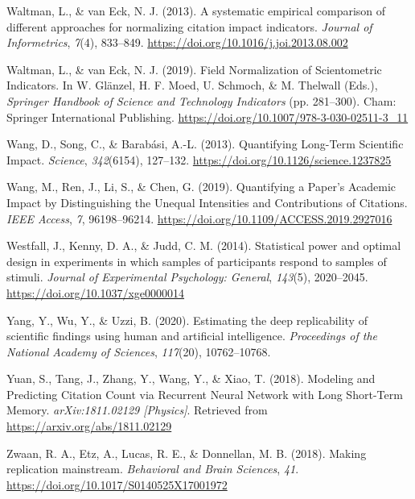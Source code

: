 \documentclass[
  english,
  man,floatsintext]{apa6}
\newlength{\cslhangindent}
\newlength{\cslentryspacingunit} %
\newenvironment{CSLReferences}[2] %
 {%
  \setlength{\parindent}{0pt}
  \ifodd #1
  \let\oldpar\par
  \def\par{\hangindent=\cslhangindent\oldpar}
  \fi
  \setlength{\parskip}{#2\cslentryspacingunit}
 }%
 {}
\begin{document}
\begin{CSLReferences}{1}{0}
\leavevmode{}%
Waltman, L., \& van Eck, N. J. (2013). A systematic empirical comparison of different approaches for normalizing citation impact indicators. \emph{Journal of Informetrics}, \emph{7}(4), 833--849. \url{https://doi.org/10.1016/j.joi.2013.08.002}

\leavevmode{}%
Waltman, L., \& van Eck, N. J. (2019). Field {Normalization} of {Scientometric Indicators}. In W. Glänzel, H. F. Moed, U. Schmoch, \& M. Thelwall (Eds.), \emph{Springer {Handbook} of {Science} and {Technology Indicators}} (pp. 281--300). {Cham}: {Springer International Publishing}. \url{https://doi.org/10.1007/978-3-030-02511-3_11}

\leavevmode{}%
Wang, D., Song, C., \& Barabási, A.-L. (2013). Quantifying {Long}-{Term Scientific Impact}. \emph{Science}, \emph{342}(6154), 127--132. \url{https://doi.org/10.1126/science.1237825}

\leavevmode{}%
Wang, M., Ren, J., Li, S., \& Chen, G. (2019). Quantifying a {Paper}'s {Academic Impact} by {Distinguishing} the {Unequal Intensities} and {Contributions} of {Citations}. \emph{IEEE Access}, \emph{7}, 96198--96214. \url{https://doi.org/10.1109/ACCESS.2019.2927016}

\leavevmode{}%
Westfall, J., Kenny, D. A., \& Judd, C. M. (2014). Statistical power and optimal design in experiments in which samples of participants respond to samples of stimuli. \emph{Journal of Experimental Psychology: General}, \emph{143}(5), 2020--2045. \url{https://doi.org/10.1037/xge0000014}

\leavevmode{}%
Yang, Y., Wu, Y., \& Uzzi, B. (2020). Estimating the deep replicability of scientific findings using human and artificial intelligence. \emph{Proceedings of the National Academy of Sciences}, \emph{117}(20), 10762--10768.

\leavevmode{}%
Yuan, S., Tang, J., Zhang, Y., Wang, Y., \& Xiao, T. (2018). Modeling and {Predicting Citation Count} via {Recurrent Neural Network} with {Long Short}-{Term Memory}. \emph{arXiv:1811.02129 {[}Physics{]}}. Retrieved from \url{https://arxiv.org/abs/1811.02129}

\leavevmode{}%
Zwaan, R. A., Etz, A., Lucas, R. E., \& Donnellan, M. B. (2018). Making replication mainstream. \emph{Behavioral and Brain Sciences}, \emph{41}. \url{https://doi.org/10.1017/S0140525X17001972}

\end{CSLReferences}
\end{document}

